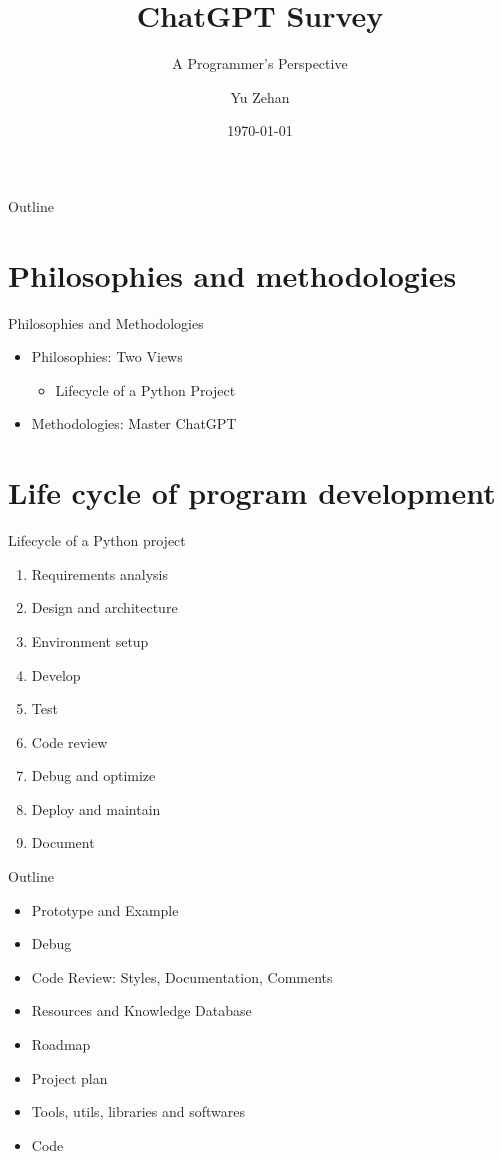 \documentclass{beamer}
\title{ChatGPT Survey}
\subtitle{A Programmer's Perspective}
\author{Yu Zehan}
\institute{Intel FLEX}
\date{\today}
\begin{document}
\begin{frame}
  \titlepage
\end{frame}

\begin{frame}{Outline}
  \tableofcontents
\end{frame}

\section{Philosophies and methodologies}
\begin{frame}{Philosophies and Methodologies}
  \begin{itemize}
    \item Philosophies: Two Views
    \begin{itemize}
      \item Lifecycle of a Python Project
    \end{itemize}
    \item Methodologies: Master ChatGPT
  \end{itemize}
\end{frame}

\section{Life cycle of program development}
\begin{frame}{Lifecycle of a Python project}
  \begin{enumerate}
  \item Requirements analysis
  \item Design and architecture
  \item Environment setup
  \item Develop
  \item Test
  \item Code review
  \item Debug and optimize
  \item Deploy and maintain
  \item Document
\end{enumerate}
\end{frame}

\begin{frame}{Outline}
  \begin{itemize}
    \item Prototype and Example
    \item Debug
    \item Code Review: Styles, Documentation, Comments
    \item Resources and Knowledge Database
    \item Roadmap
    \item Project plan
    \item Tools, utils, libraries and softwares
    \item Code 
  \end{itemize}
\end{frame}
\end{document}

